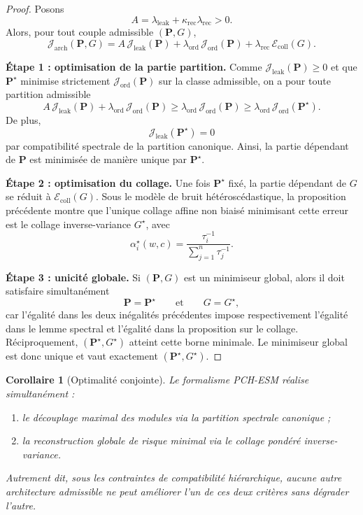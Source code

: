\documentclass[11pt,a4paper]{article}
\newtheorem{corollary}{Corollaire}[section]
\newcommand{\1}{\mathbf 1}
\begin{document}
\begin{proof}
Posons
\[
A=\lambda_{\mathrm{leak}}+\kappa_{\mathrm{rec}}\lambda_{\mathrm{rec}}>0.
\]
Alors, pour tout couple admissible \((\mathbf P,G)\),
\[
\mathcal J_{\mathrm{arch}}(\mathbf P,G)
=
A\,\mathcal J_{\mathrm{leak}}(\mathbf P)
+
\lambda_{\mathrm{ord}}\,\mathcal J_{\mathrm{ord}}(\mathbf P)
+
\lambda_{\mathrm{rec}}\,\mathcal E_{\mathrm{coll}}(G).
\]

\medskip
\noindent
\textbf{Étape 1 : optimisation de la partie partition.}
Comme \(\mathcal J_{\mathrm{leak}}(\mathbf P)\ge 0\) et que \(\mathbf P^\star\) minimise strictement \(\mathcal J_{\mathrm{ord}}(\mathbf P)\) sur la classe admissible, on a pour toute partition admissible
\[
A\,\mathcal J_{\mathrm{leak}}(\mathbf P)+\lambda_{\mathrm{ord}}\,\mathcal J_{\mathrm{ord}}(\mathbf P)
\ge
\lambda_{\mathrm{ord}}\,\mathcal J_{\mathrm{ord}}(\mathbf P)
\ge
\lambda_{\mathrm{ord}}\,\mathcal J_{\mathrm{ord}}(\mathbf P^\star).
\]
De plus,
\[
\mathcal J_{\mathrm{leak}}(\mathbf P^\star)=0
\]
par compatibilité spectrale de la partition canonique.
Ainsi, la partie dépendant de \(\mathbf P\) est minimisée de manière unique par \(\mathbf P^\star\).

\medskip
\noindent
\textbf{Étape 2 : optimisation du collage.}
Une fois \(\mathbf P^\star\) fixé, la partie dépendant de \(G\) se réduit à \(\mathcal E_{\mathrm{coll}}(G)\).
Sous le modèle de bruit hétéroscédastique, la proposition précédente montre que l'unique collage affine non biaisé minimisant cette erreur est le collage inverse-variance \(G^\star\), avec
\[
\alpha_i^\star(w,c)=\frac{\tau_i^{-1}}{\sum_{j=1}^n\tau_j^{-1}}.
\]

\medskip
\noindent
\textbf{Étape 3 : unicité globale.}
Si \((\mathbf P,G)\) est un minimiseur global, alors il doit satisfaire simultanément
\[
\mathbf P=\mathbf P^\star
\qquad\text{et}\qquad
G=G^\star,
\]
car l'égalité dans les deux inégalités précédentes impose respectivement l'égalité dans le lemme spectral et l'égalité dans la proposition sur le collage.
Réciproquement, \((\mathbf P^\star,G^\star)\) atteint cette borne minimale.
Le minimiseur global est donc unique et vaut exactement \((\mathbf P^\star,G^\star)\).
\end{proof}

\begin{corollary}[Optimalité conjointe]
Le formalisme PCH-ESM réalise simultanément :
\begin{enumerate}[leftmargin=2em]
    \item le découplage maximal des modules via la partition spectrale canonique ;
    \item la reconstruction globale de risque minimal via le collage pondéré inverse-variance.
\end{enumerate}
Autrement dit, sous les contraintes de compatibilité hiérarchique, aucune autre architecture admissible ne peut améliorer l'un de ces deux critères sans dégrader l'autre.
\end{corollary}
\end{document}
